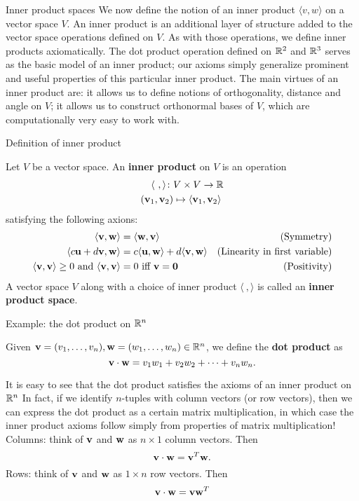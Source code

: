 \begin{frame}{Inner product spaces}
We now define the notion of an inner product $\langle v,w \rangle$ on a vector space $V$. 
\bpause An inner product is an additional layer of structure added to the vector space operations defined on $V$. As with those operations, we define inner products \alert{axiomatically}. 
\bpause
The dot product operation defined on ${\mathbb R}^2$ and ${\mathbb R}^3$ serves as the basic model of an inner product; our axioms simply generalize prominent and useful properties of this particular inner product. 
\bpause
The main virtues of an inner product are:
\bb
\ii it allows us to define notions of orthogonality, distance and angle on $V$;
\ii it allows us to construct \alert{orthonormal} bases of $V$, which are computationally very easy to work with.  
\ee  
\end{frame}
\begin{frame}{Definition of inner product}
\begin{definition}
Let $V$ be a vector space. An {\bf inner product} on $V$ is an operation
\begin{align*}
\langle \ , \rangle \colon &V\times V\rightarrow {\mathbb R} \\
({\mathbf v}_1,{\mathbf v}_2)&\mapsto \langle {\mathbf v}_1,{\mathbf v}_2\rangle
\end{align*}
satisfying the following axions:
\begin{align*}
\langle {\mathbf v},{\mathbf w}\rangle&=\langle {\mathbf w},{\mathbf v}\rangle &\text{(Symmetry)}\\
\langle c{\mathbf u}+d{\mathbf v},{\mathbf w}\rangle&=c\langle{\mathbf u},{\mathbf w}\rangle+d\langle{\mathbf v},{\mathbf w}\rangle &\text{(Linearity in first variable)}\\
\langle {\mathbf v},{\mathbf v}\rangle\geq 0\text{ and }\langle {\mathbf v},{\mathbf v}\rangle &=0 \text{ iff  }{\mathbf v}={\mathbf 0} &\text{(Positivity)}\\
\end{align*}
A vector space $V$ along with a choice of inner product $\langle \ , \rangle$ is called an {\bf inner product space}. 
\end{definition}
\end{frame}
\begin{frame}{Example: the dot product on ${\mathbb R}^n$}
\begin{definition}
Given ${\mathbf v}=(v_1,\dots,v_n), {\mathbf w}=(w_1,\dots,w_n)\in{\mathbb R}^n$, we define the {\bf dot product} as 
\[
{\mathbf v}\cdot{\mathbf w}=v_1w_1+v_2w_2+\cdots +v_nw_n.
\]
\end{definition}
It is easy to see that the dot product satisfies the axioms of an inner product on ${\mathbb R}^n$
\bpause 
In fact, if we identify $n$-tuples with column vectors (or row vectors), then we can express the dot product as a certain matrix multiplication, in which case the inner product axioms follow simply from properties of matrix multiplication!  
\bpause
\alert{Columns:} think of ${\mathbf v}$ and ${\mathbf w}$ as $n\times 1$ column vectors. Then 
\[
{\mathbf v}\cdot{\mathbf w}={\mathbf v}^T{\mathbf w}.
\]
\bpause
\alert{Rows:} think of ${\mathbf v}$ and ${\mathbf w}$ as $1\times n$ row vectors. Then 
\[
{\mathbf v}\cdot{\mathbf w}={\mathbf v}{\mathbf w}^T
\]

\end{frame}
